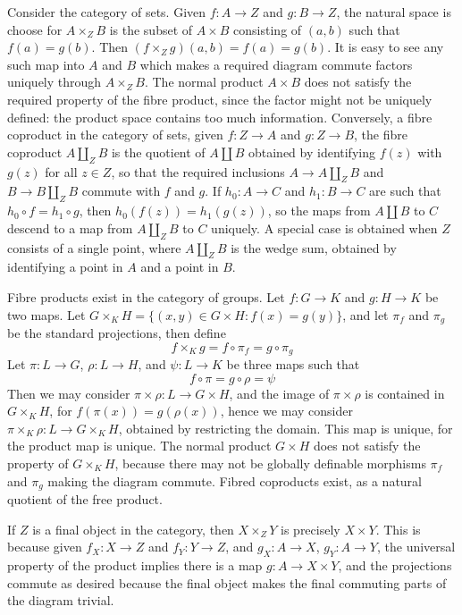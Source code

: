 \begin{example}
    Consider the category of sets. Given $f: A \to Z$ and $g: B \to Z$, the natural space is choose for $A \times_Z B$ is the subset of $A \times B$ consisting of $(a,b)$ such that $f(a) = g(b)$. Then $(f \times_Z g)(a,b) = f(a) = g(b)$. It is easy to see any such map into $A$ and $B$ which makes a required diagram commute factors uniquely through $A \times_Z B$. The normal product $A \times B$ does not satisfy the required property of the fibre product, since the factor might not be uniquely defined: the product space contains too much information. Conversely, a fibre coproduct in the category of sets, given $f: Z \to A$ and $g: Z \to B$, the fibre coproduct $A \coprod_Z B$ is the quotient of $A \coprod B$ obtained by identifying $f(z)$ with $g(z)$ for all $z \in Z$, so that the required inclusions $A \to A \coprod_Z B$ and $B \to B \coprod_Z B$ commute with $f$ and $g$. If $h_0: A \to C$ and $h_1: B \to C$ are such that $h_0 \circ f = h_1 \circ g$, then $h_0(f(z)) = h_1(g(z))$, so the maps from $A \coprod B$ to $C$ descend to a map from $A \coprod_Z B$ to $C$ uniquely. A special case is obtained when $Z$ consists of a single point, where $A \coprod_Z B$ is the wedge sum, obtained by identifying a point in $A$ and a point in $B$.
\end{example}

\begin{example}
    Fibre products exist in the category of groups. Let $f: G \to K$ and $g: H \to K$ be two maps. Let $G \times_K H = \{ (x,y) \in G \times H : f(x) = g(y) \}$, and let $\pi_f$ and $\pi_g$ be the standard projections, then define
    \[ f \times_K g = f \circ \pi_f = g \circ \pi_g \]
    Let $\pi: L \to G$, $\rho: L \to H$, and $\psi: L \to K$ be three maps such that
    \[ f \circ \pi = g \circ \rho = \psi \]
    Then we may consider $\pi \times \rho: L \to G \times H$, and the image of $\pi \times \rho$ is contained in $G \times_K H$, for $f(\pi(x)) = g(\rho(x))$, hence we may consider $\pi \times_K \rho: L \to G \times_K H$, obtained by restricting the domain. This map is unique, for the product map is unique. The normal product $G \times H$ does not satisfy the property of $G \times_K H$, because there may not be globally definable morphisms $\pi_f$ and $\pi_g$ making the diagram commute. Fibred coproducts exist, as a natural quotient of the free product.
\end{example}

\begin{example}
    If $Z$ is a final object in the category, then $X \times_Z Y$ is precisely $X \times Y$. This is because given $f_X: X \to Z$ and $f_Y: Y \to Z$, and $g_X: A \to X$, $g_Y: A \to Y$, the universal property of the product implies there is a map $g: A \to X \times Y$, and the projections commute as desired because the final object makes the final commuting parts of the diagram trivial.
\end{example}

